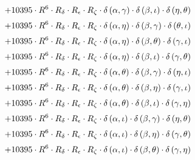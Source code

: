 \begin{subequations}
\begin{gather}
 \\[0.2em] \notag 		 + 10395 \cdot R^{6} \cdot R_{\delta{}} \cdot R_{\epsilon{}} \cdot R_{\zeta{}} \cdot \delta{}\left(\alpha{}, \gamma{}\right) \cdot \delta{}\left(\beta{}, \iota{}\right) \cdot \delta{}\left(\eta{}, \theta{}\right) 
 \\[0.2em] \notag 		 + 10395 \cdot R^{6} \cdot R_{\delta{}} \cdot R_{\epsilon{}} \cdot R_{\zeta{}} \cdot \delta{}\left(\alpha{}, \eta{}\right) \cdot \delta{}\left(\beta{}, \gamma{}\right) \cdot \delta{}\left(\theta{}, \iota{}\right) 
 \\[0.2em] \notag 		 + 10395 \cdot R^{6} \cdot R_{\delta{}} \cdot R_{\epsilon{}} \cdot R_{\zeta{}} \cdot \delta{}\left(\alpha{}, \eta{}\right) \cdot \delta{}\left(\beta{}, \theta{}\right) \cdot \delta{}\left(\gamma{}, \iota{}\right) 
 \\[0.2em] \notag 		 + 10395 \cdot R^{6} \cdot R_{\delta{}} \cdot R_{\epsilon{}} \cdot R_{\zeta{}} \cdot \delta{}\left(\alpha{}, \eta{}\right) \cdot \delta{}\left(\beta{}, \iota{}\right) \cdot \delta{}\left(\gamma{}, \theta{}\right) 
 \\[0.2em] \notag 		 + 10395 \cdot R^{6} \cdot R_{\delta{}} \cdot R_{\epsilon{}} \cdot R_{\zeta{}} \cdot \delta{}\left(\alpha{}, \theta{}\right) \cdot \delta{}\left(\beta{}, \gamma{}\right) \cdot \delta{}\left(\eta{}, \iota{}\right) 
 \\[0.2em] \notag 		 + 10395 \cdot R^{6} \cdot R_{\delta{}} \cdot R_{\epsilon{}} \cdot R_{\zeta{}} \cdot \delta{}\left(\alpha{}, \theta{}\right) \cdot \delta{}\left(\beta{}, \eta{}\right) \cdot \delta{}\left(\gamma{}, \iota{}\right) 
 \\[0.2em] \notag 		 + 10395 \cdot R^{6} \cdot R_{\delta{}} \cdot R_{\epsilon{}} \cdot R_{\zeta{}} \cdot \delta{}\left(\alpha{}, \theta{}\right) \cdot \delta{}\left(\beta{}, \iota{}\right) \cdot \delta{}\left(\gamma{}, \eta{}\right) 
 \\[0.2em] \notag 		 + 10395 \cdot R^{6} \cdot R_{\delta{}} \cdot R_{\epsilon{}} \cdot R_{\zeta{}} \cdot \delta{}\left(\alpha{}, \iota{}\right) \cdot \delta{}\left(\beta{}, \gamma{}\right) \cdot \delta{}\left(\eta{}, \theta{}\right) 
 \\[0.2em] \notag 		 + 10395 \cdot R^{6} \cdot R_{\delta{}} \cdot R_{\epsilon{}} \cdot R_{\zeta{}} \cdot \delta{}\left(\alpha{}, \iota{}\right) \cdot \delta{}\left(\beta{}, \eta{}\right) \cdot \delta{}\left(\gamma{}, \theta{}\right) 
 \\[0.2em] \notag 		 + 10395 \cdot R^{6} \cdot R_{\delta{}} \cdot R_{\epsilon{}} \cdot R_{\zeta{}} \cdot \delta{}\left(\alpha{}, \iota{}\right) \cdot \delta{}\left(\beta{}, \theta{}\right) \cdot \delta{}\left(\gamma{}, \eta{}\right) 

\end{gather}
\end{subequations}
